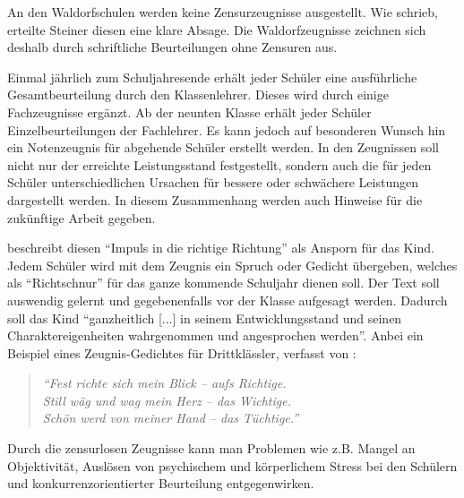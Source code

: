 An den Waldorfschulen werden keine Zensurzeugnisse ausgestellt. Wie \cite{geuenich09} schrieb, erteilte Steiner diesen eine klare Absage. Die Waldorfzeugnisse zeichnen sich deshalb durch schriftliche Beurteilungen ohne Zensuren aus. 

Einmal jährlich zum Schuljahresende erhält jeder Schüler eine ausführliche Gesamtbeurteilung durch den Klassenlehrer. Dieses wird durch einige Fachzeugnisse ergänzt. Ab der neunten Klasse erhält jeder Schüler Einzelbeurteilungen der Fachlehrer. Es kann jedoch auf besonderen Wunsch hin ein Notenzeugnis für abgehende Schüler erstellt werden. In den Zeugnissen soll nicht nur der erreichte Leistungsstand festgestellt, sondern auch die für jeden Schüler unterschiedlichen Ursachen für bessere oder schwächere Leistungen dargestellt werden. In diesem Zusammenhang werden auch Hinweise für die zukünftige Arbeit gegeben. \citep[Vgl.][S. 51]{kiersch07}


 \citet[S. 102]{geuenich09} beschreibt diesen \enquote{Impuls in die richtige Richtung} als Ansporn für das Kind. Jedem Schüler wird mit dem Zeugnis ein Spruch oder Gedicht übergeben, welches als \enquote{Richtschnur} für das ganze kommende Schuljahr dienen soll. Der Text soll auswendig gelernt und gegebenenfalls vor der Klasse aufgesagt werden. Dadurch soll das Kind \enquote{ganzheitlich [...] in seinem Entwicklungsstand und seinen Charaktereigenheiten wahrgenommen und angesprochen werden}. Anbei ein Beispiel eines Zeugnis-Gedichtes für Drittklässler, verfasst von \cite{kullak13}:

 \begin{quotation}
			\emph{\enquote{Fest richte sich mein Blick – aufs Richtige.\\
							Still wäg und wag mein Herz – das Wichtige.\\
							Schön werd von meiner Hand – das Tüchtige.}}
\end{quotation}

Durch die zensurlosen Zeugnisse kann man Problemen wie z.B. Mangel an Objektivität, Auslösen von psychischem und körperlichem Stress bei den Schülern und konkurrenzorientierter Beurteilung entgegenwirken. 



 








